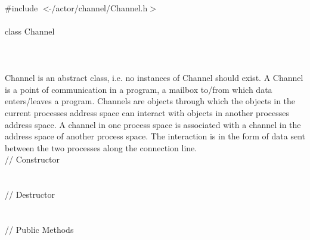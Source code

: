 
   \\
\indent \#include $<\tilde{ }$/actor/channel/Channel.h$>$  \\

  \\
\indent class Channel \\

 \\
 \\

  \\
\indent Channel is an abstract class, i.e. no instances of Channel
should exist. A Channel is a point of communication in a program, a
mailbox to/from which data enters/leaves a program. Channels are
objects through which the objects in the current processes address
space can interact with objects in another processes address space. A
channel in one process space is associated with a channel in the
address space of another process space. The interaction is in the form
of data sent between the two processes along the connection line. \\ 

\indent // Constructor  \\
  \\ \\
\indent // Destructor \\
\\  \\
\indent // Public Methods  \\
 \\
 \\
 \\
\\
\\
 \\

\\
\\
 
